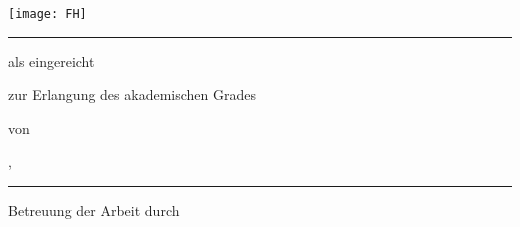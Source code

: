 \makeatletter
	\begin{titlepage}
		\centering
		\texttt{[image: FH]} \par
			\vskip 6mm
		\textsc{\Large \@coursetype}
			\vskip 2mm
		{\Large \@course}
			\vskip 0mm

		\rule{15cm}{0.3mm}

		    \vfill
		{\bfseries\LARGE \@title\par} %
			\vfill

		als \textsc{\@doctype} eingereicht
			\vskip 2mm

		zur Erlangung des akademischen Grades
			\vskip 6mm
		\@degree
			\vskip 6mm

		von
			\vskip 6mm
		{\bfseries\large \@author\par}
			\vskip 6mm

		\@location, {\large \@submonth\ \@subyear}
			\vskip 6mm

		\rule{15cm}{0.3mm}
			\vskip 5mm
		Betreuung der Arbeit durch
			\vskip 0mm
		\@supervisor
	\end{titlepage}
\makeatother
